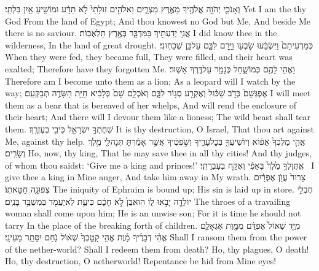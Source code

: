 {וְאָנֹכִ֛י יְהֹוָ֥ה אֱלֹהֶ֖יךָ מֵאֶ֣רֶץ מִצְרָ֑יִם וֵאלֹהִ֤ים זוּלָתִי֙ לֹ֣א תֵדָ֔ע וּמוֹשִׁ֥יעַ אַ֖יִן בִּלְתִּֽי׃}
{Yet I am the \lord\space thy God From the land of Egypt; And thou knowest no God but Me, And beside Me there is no saviour.}
{אֲנִ֥י יְדַעְתִּ֖יךָ בַּמִּדְבָּ֑ר בְּאֶ֖רֶץ תַּלְאֻבֽוֹת׃}
{I did know thee in the wilderness, In the land of great drought.}
{כְּמַרְעִיתָם֙ וַיִּשְׂבָּ֔עוּ שָׂבְע֖וּ וַיָּ֣רׇם לִבָּ֑ם עַל\maqqaf כֵּ֖ן שְׁכֵחֽוּנִי׃}
{When they were fed, they became full, They were filled, and their heart was exalted; Therefore have they forgotten Me.}
{וָאֱהִ֥י לָהֶ֖ם כְּמוֹ\maqqaf שָׁ֑חַל כְּנָמֵ֖ר עַל\maqqaf דֶּ֥רֶךְ אָשֽׁוּר׃}
{Therefore am I become unto them as a lion; As a leopard will I watch by the way;}
{אֶפְגְּשֵׁם֙ כְּדֹ֣ב שַׁכּ֔וּל וְאֶקְרַ֖ע סְג֣וֹר לִבָּ֑ם וְאֹכְלֵ֥ם שָׁם֙ כְּלָבִ֔יא חַיַּ֥ת הַשָּׂדֶ֖ה תְּבַקְּעֵֽם׃}
{I will meet them as a bear that is bereaved of her whelps, And will rend the enclosure of their heart; And there will I devour them like a lioness; The wild beast shall tear them.}
{שִׁחֶתְךָ֥ יִשְׂרָאֵ֖ל כִּי\maqqaf בִ֥י בְעֶזְרֶֽךָ׃}
{It is thy destruction, O Israel, That thou art against Me, against thy help.}
{אֱהִ֤י מַלְכְּךָ֙ אֵפ֔וֹא וְיוֹשִׁיעֲךָ֖ בְּכׇל\maqqaf עָרֶ֑יךָ וְשֹׁ֣פְטֶ֔יךָ אֲשֶׁ֣ר אָמַ֔רְתָּ תְּנָה\maqqaf לִּ֖י מֶ֥לֶךְ וְשָׂרִֽים׃}
{Ho, now, thy king, That he may save thee in all thy cities! And thy judges, of whom thou saidst: ‘Give me a king and princes!’}
{אֶֽתֶּן\maqqaf לְךָ֥ מֶ֙לֶךְ֙ בְּאַפִּ֔י וְאֶקַּ֖ח בְּעֶבְרָתִֽי׃ \petucha }
{I give thee a king in Mine anger, And take him away in My wrath.}
{צָרוּר֙ עֲוֺ֣ן אֶפְרָ֔יִם צְפוּנָ֖ה חַטָּאתֽוֹ׃}
{The iniquity of Ephraim is bound up; His sin is laid up in store.}
{חֶבְלֵ֥י יוֹלֵדָ֖ה יָבֹ֣אוּ ל֑וֹ הוּא\maqqaf בֵן֙ לֹ֣א חָכָ֔ם כִּי\maqqaf עֵ֥ת לֹֽא\maqqaf יַעֲמֹ֖ד בְּמִשְׁבַּ֥ר בָּנִֽים׃}
{The throes of a travailing woman shall come upon him; He is an unwise son; For it is time he should not tarry In the place of the breaking forth of children.}
{מִיַּ֤ד שְׁאוֹל֙ אֶפְדֵּ֔ם מִמָּ֖וֶת אֶגְאָלֵ֑ם אֱהִ֨י דְבָרֶ֜יךָ מָ֗וֶת אֱהִ֤י קָֽטׇבְךָ֙ שְׁא֔וֹל נֹ֖חַם יִסָּתֵ֥ר מֵעֵינָֽי׃}
{Shall I ransom them from the power of the nether-world? Shall I redeem them from death? Ho, thy plagues, O death! Ho, thy destruction, O netherworld! Repentance be hid from Mine eyes!}
